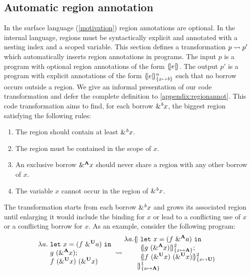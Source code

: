 
\subsection{Automatic region annotation}
\label{regionannot}

In the surface language (\cref{motivation}) region annotations are optional.
In the internal language, regions must be syntactically explicit and
annotated with a nesting index and a scoped variable.
This section defines a transformation $\RannotT{p}{p'}$ which
automatically inserts region annotations in  programs.
The input $p$ is a program with optional region annotations of the form $\region[]{}{e}$.
The output $p'$ is a program with explicit annotations
of the form $\region{\Sone x\BORROW}{e}$ such that no borrow occurs
outside a region.
We give an informal presentation of our code transformation and defer
the complete definition to \cref{appendix:regionannot}. This code transformation
aims to find, for each borrow $\borrow{x}$, the biggest region satisfying
the following rules:
\begin{enumerate}
\item The region should contain at least $\borrow{x}$.
\item The region must be contained in the scope of $x$.
\item An exclusive borrow $\borrow[\kaff]{x}$ should never share a region with any other borrow of $x$.
\item The variable $x$ cannot occur in the region of $\borrow{x}$.
\end{enumerate}
The transformation starts from each borrow $\borrow x$ and grows its associated
region until enlarging it would include the binding for $x$ or lead to a
conflicting use of $x$ or a conflicting borrow for $x$.
As an example, consider the following program:
%
\[
  \setlength{\jot}{-1pt}
  \RannotT{
\begin{aligned}
  \lam{a}{}\ &
  \letin{x}{\app{f}{\borrow[\kun]{a}}}{}\\
  &g\ (\borrow[\kaff]{x});\\
  &f\ (\borrow[\kun]{x})\ (\borrow[\kun]{x})\\
\end{aligned}
}{
\begin{aligned}
  \lam{a}{}\region[1]{\Sone a\MBORROW}{\ &%
  \letin{x}{\app{f}{\borrow[\kaff]{a}}}{}\\
  &\region[2]{\Sone x\MBORROW}{g\ (\borrow[\kaff]{x})};\\
  &\region[2]{\Sone x\IBORROW}{f\ (\borrow[\kun]{x})\ (\borrow[\kun]{x})}\\
  &\!\!\!}
\end{aligned}
}
\]
